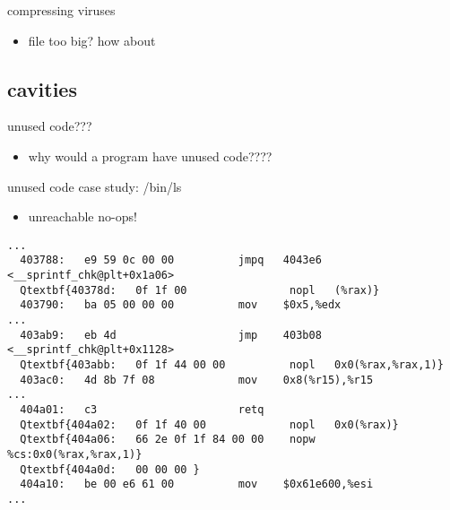 \begin{frame}{compressing viruses}
    \begin{itemize}
    \item file too big? how about 
    \end{itemize}
\end{frame}

\subsection{cavities}


\begin{frame}{unused code???}
    \begin{itemize}
    \item why would a program have unused code????
    \end{itemize}
\end{frame}

\begin{frame}[fragile,label=lsStudy1]{unused code case study: /bin/ls}
    \begin{itemize}
    \item unreachable no-ops!
    \end{itemize}
\begin{Verbatim}[fontsize=\fontsize{9}{10}\selectfont,commandchars=Q\{\}]
...
  403788:	e9 59 0c 00 00       	jmpq   4043e6 <__sprintf_chk@plt+0x1a06>
  Qtextbf{40378d:	0f 1f 00             	nopl   (%rax)}
  403790:	ba 05 00 00 00       	mov    $0x5,%edx
...
  403ab9:	eb 4d                	jmp    403b08 <__sprintf_chk@plt+0x1128>
  Qtextbf{403abb:	0f 1f 44 00 00       	nopl   0x0(%rax,%rax,1)}
  403ac0:	4d 8b 7f 08          	mov    0x8(%r15),%r15
...
  404a01:	c3                   	retq   
  Qtextbf{404a02:	0f 1f 40 00          	nopl   0x0(%rax)}
  Qtextbf{404a06:	66 2e 0f 1f 84 00 00 	nopw   %cs:0x0(%rax,%rax,1)}
  Qtextbf{404a0d:	00 00 00 }
  404a10:	be 00 e6 61 00       	mov    $0x61e600,%esi
...
\end{Verbatim}
\end{frame}

